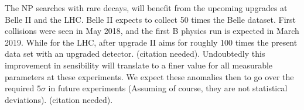 The NP searches with rare decays, will benefit from the upcoming upgrades at Belle II and the LHC. Belle II expects to collect 50 times the Belle dataset. First collisions were seen in May 2018, and the first B physics run is expected in March 2019. While for the LHC, after upgrade II aims for roughly 100 times the present data set with an upgraded detector. {\color{blue} (citation needed)}.
%
Undoubtedly this improvement in sensibility will translate to a finer value for all measurable parameters at these experiments. We expect these anomalies then to go over the required $5 \sigma$ in future experiments (Assuming of course, they are not statistical deviations). {\color{blue} (citation needed)}.

